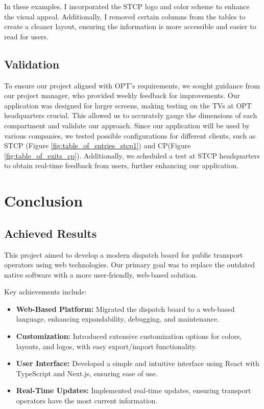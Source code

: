 \documentclass[10pt]{article}
\begin{document}
        In these examples, I incorporated the STCP logo and color scheme to enhance the visual appeal.
        Additionally, I removed certain columns from the tables to create a cleaner layout, ensuring the information is more accessible and easier to read for users.

        \subsection{Validation}

        To ensure our project aligned with OPT's requirements, we sought guidance from our project manager, who provided weekly feedback for improvements. Our application was designed for larger screens, making testing on the TVs at OPT headquarters crucial. This allowed us to accurately gauge the dimensions of each compartment and validate our approach. 
        Since our application will be used by various companies, we tested possible configurations for different clients, such as STCP (Figure \ref{fig:table_of_entries_stcp1}) and CP(Figure \ref{fig:table_of_exits_cp}). Additionally, we scheduled a test at STCP headquarters to obtain real-time feedback from users, further enhancing our application.

        \section{Conclusion}


        \subsection{Achieved Results}
        This project aimed to develop a modern dispatch board for public transport operators using web technologies. Our primary goal was to replace the outdated native software with a more user-friendly, web-based solution. 

        Key achievements include:

        \begin{itemize}
            \item \textbf{Web-Based Platform:} Migrated the dispatch board to a web-based language, enhancing expandability, debugging, and maintenance.
            \item \textbf{Customization:} Introduced extensive customization options for colors, layouts, and logos, with easy export/import functionality.
            \item \textbf{User Interface:} Developed a simple and intuitive interface using React with TypeScript and Next.js, ensuring ease of use.
            \item \textbf{Real-Time Updates:} Implemented real-time updates, ensuring transport operators have the most current information.
        \end{itemize}
\end{document}
